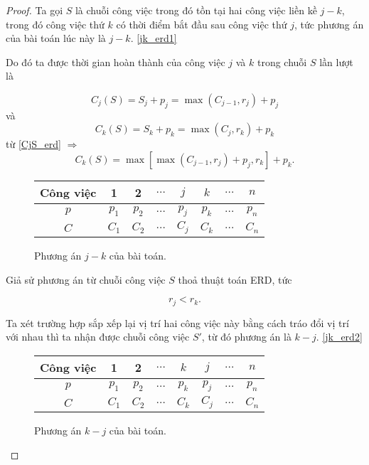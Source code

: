 \documentclass[12pt,a4paper]{report}
\begin{document}
\begin{proof}
	Ta gọi $S$ là chuỗi công việc trong đó tồn tại hai công việc liền kề $j - k$, trong đó công việc thứ $k$ có thời điểm bắt đầu sau công việc thứ $j$, tức phương án của bài toán lúc này là $j - k$. \eqref{jk_erd1}
	
	Do đó ta được thời gian hoàn thành của công việc $j$ và $k$ trong chuỗi $S$ lần lượt là
	
	\begin{equation} \label{CjS_erd}
		C_j(S) = S_j + p_j = \max ( C_{j-1} , r_j ) + p_j
	\end{equation}
	và
	\begin{equation}
		C_k(S) = S_k + p_k = \max (C_j , r_k ) + p_k
	\end{equation}
	từ \eqref{CjS_erd}
	$\Rightarrow$
	\begin{equation} \label{CkS_erd}
		C_k(S) = \max \left[ \max (C_{j-1} , r_j ) + p_j , r_k \right] + p_k.
	\end{equation}

	\begin{figure}[h!]
		\centering
		 \begin{tabular}{|c | c c c c c c c |} 
		 \hline
		 Công việc & 1 & 2 & $\ldots$ & $j$ & $k$ & $\ldots$ & $n$ \\
		 \hline\hline
		 $p$ & $p_1$ & $p_2$ & $\ldots$ & $p_j$ & $p_k$ & $\ldots$ & $p_n$ \\
		 $C$ & $C_1$ & $C_2$ & $\ldots$ & $C_j$ & $C_k$ & $\ldots$ & $C_n$ \\
		 \hline
		 \end{tabular}
	\caption{\label{jk_erd1}Phương án $j - k$ của bài toán.}
	\end{figure}

	Giả sử phương án từ chuỗi công việc $S$ thoả thuật toán ERD, tức
	
	\begin{equation} \label{rj<rk}
		r_j < r_k.
	\end{equation}

	Ta xét trường hợp sắp xếp lại vị trí hai công việc này bằng cách tráo đổi vị trí với nhau thì ta nhận được chuỗi công việc $S'$, từ đó phương án là $k - j$. \eqref{jk_erd2}

	\begin{figure}[h!]
		\centering
		 \begin{tabular}{|c | c c c c c c c |} 
		 \hline
		 Công việc & 1 & 2 & $\ldots$ & $k$ & $j$ & $\ldots$ & $n$ \\
		 \hline\hline
		 $p$ & $p_1$ & $p_2$ & $\ldots$ & $p_k$ & $p_j$ & $\ldots$ & $p_n$ \\
		 $C$ & $C_1$ & $C_2$ & $\ldots$ & $C_k$ & $C_j$ & $\ldots$ & $C_n$ \\
		 \hline
		 \end{tabular}
	\caption{\label{jk_erd2}Phương án $k - j$ của bài toán.}
	\end{figure}


\end{proof}
\end{document}
